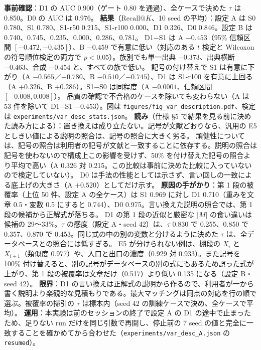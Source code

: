 \documentclass[11pt,a4paper]{jsarticle}
\begin{document}
\begin{itemize}[nosep]
    \textbf{事前確認}：D1 の AUC 0.900（ゲート 0.80 を通過）、全ケースで決めた $\tau$ は 0.850。D0 の AUC は 0.976。
    \textbf{結果}（$\textrm{Recall@}K$、10 seed の平均）：設定 A は S0 0.780、S1 0.780、S1-r50 0.215、S1-r100 0.000、D1 0.326、D0 0.846。設定 B は 0.740、0.745、0.235、0.000、0.286、0.781。
    D1$-$S1 は A $-0.453$（95\% 信頼区間 $[-0.472, -0.435]$）、B $-0.459$ で有意に低い（対応のある $t$ 検定と Wilcoxon の符号順位検定の両方で $p<0.05$）。族別でも単一出典 $-0.373$、出典横断 $-0.463$、合成 $-0.454$ と、すべての族で低い。
    記号の付け替えで S1 は有意に下がり（A $-0.565$／$-0.780$、B $-0.510$／$-0.745$）、D1 は S1-r100 を有意に上回る（A $+0.326$、B $+0.286$）。S1$-$S0 は同程度（A $-0.0001$、信頼区間 $[-0.008, 0.008]$）。
    品質の確認で不合格のケースを除いても変わらない（A は 53 件を除いて D1$-$S1 $-0.453$）。図は \texttt{figures/fig\_var\_description.pdf}、検定は \texttt{experiments/var\_desc\_stats.json}。
    \textbf{読み}（仕様 \S5 で結果を見る前に決めた読み方による）：置き換えは成り立たない。記号が文献どおりなら、汎用の E5 としきい値による説明の照合は、記号の照合に大きく劣る。
    頑健性については、記号の照合は利用者の記号が文献と一致することに依存する。説明の照合は記号を使わないので構成上この影響を受けず、50\% を付け替えた記号の照合より平均で高い（A 0.326 対 0.215。この比較は事前に決めた比較に入っていないので検定していない）。
    D0 は手法の性能としては示さず、言い回しの一致による底上げの大きさ（A $+0.520$）としてだけ示す。
    \textbf{原因の手がかり}：第 1 段の被覆率（上位 50 件、設定 A の全ケース）は S1 0.969 に対し D1 0.710（重みを文章 0.5・変数 0.5 にすると 0.744）、D0 0.975。言い換えた説明の照合では、第 1 段の候補から正解式が落ちる。
    D1 の第 1 段の近似と厳密な $|M|$ の食い違いは候補の 29〜33\%。$\tau$ の感度（設定 A・seed 42）は、$\tau$ 0.830 で 0.255、0.850 で 0.357、0.870 で 0.453。同じ式の中の別の変数と分けるように決めた $\tau$ は、全データベースとの照合には低すぎる。
    E5 が分けられない例は、棚段の $X_i$ と $X_{i+1}$（類似度 0.977）や、入口と出口の濃度（0.929 対 0.933）。また記号を 100\% 付け替えると、別の記号がデータベースの別の式にもあるため誤った式が上がり、第 1 段の被覆率は文章だけ（0.517）より低い 0.135 になる（設定 B・seed 42）。
    \textbf{限界}：D1 の言い換えは正解式の説明から作るので、利用者が一から書く説明より楽観的な見積もりである。最大マッチングは同点の対応を行の順で選ぶ。被覆率の掃引の $\tau$ は標本内（seed 42 の訓練ケースで決め、全ケースで平均）。
    \textbf{運用}：本実験は前のセッションの終了で設定 A の D1 の途中で止まったため、足りない run だけを同じ引数で再開し、停止前の 7 seed の値と完全に一致することを確かめてから合わせた（\texttt{experiments/var\_desc\_A.json} の \texttt{resumed}）。

\end{itemize}
\end{document}
